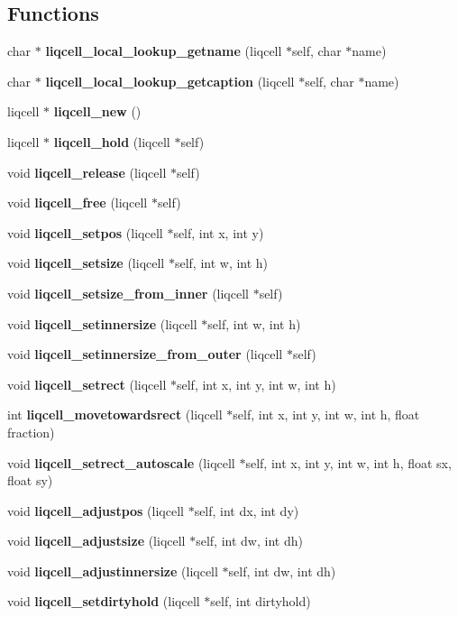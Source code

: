 \subsection*{Functions}
\begin{CompactItemize}
\item 
char $\ast$ \textbf{liqcell\_\-local\_\-lookup\_\-getname} (liqcell $\ast$self, char $\ast$name)\label{d5/da2/liqcell_8c_887c8f2262214c0908e9beec3307baae}

\item 
char $\ast$ \textbf{liqcell\_\-local\_\-lookup\_\-getcaption} (liqcell $\ast$self, char $\ast$name)\label{d5/da2/liqcell_8c_d57749faa1212b519e7ef7683bca31b7}

\item 
liqcell $\ast$ {\bf liqcell\_\-new} ()
\item 
liqcell $\ast$ {\bf liqcell\_\-hold} (liqcell $\ast$self)
\item 
void {\bf liqcell\_\-release} (liqcell $\ast$self)
\item 
void {\bf liqcell\_\-free} (liqcell $\ast$self)
\item 
void {\bf liqcell\_\-setpos} (liqcell $\ast$self, int x, int y)
\item 
void {\bf liqcell\_\-setsize} (liqcell $\ast$self, int w, int h)
\item 
void {\bf liqcell\_\-setsize\_\-from\_\-inner} (liqcell $\ast$self)
\item 
void {\bf liqcell\_\-setinnersize} (liqcell $\ast$self, int w, int h)
\item 
void {\bf liqcell\_\-setinnersize\_\-from\_\-outer} (liqcell $\ast$self)
\item 
void {\bf liqcell\_\-setrect} (liqcell $\ast$self, int x, int y, int w, int h)
\item 
int {\bf liqcell\_\-movetowardsrect} (liqcell $\ast$self, int x, int y, int w, int h, float fraction)
\item 
void {\bf liqcell\_\-setrect\_\-autoscale} (liqcell $\ast$self, int x, int y, int w, int h, float sx, float sy)
\item 
void {\bf liqcell\_\-adjustpos} (liqcell $\ast$self, int dx, int dy)
\item 
void {\bf liqcell\_\-adjustsize} (liqcell $\ast$self, int dw, int dh)
\item 
void {\bf liqcell\_\-adjustinnersize} (liqcell $\ast$self, int dw, int dh)
\item 
void {\bf liqcell\_\-setdirtyhold} (liqcell $\ast$self, int dirtyhold)

\end{CompactItemize}
